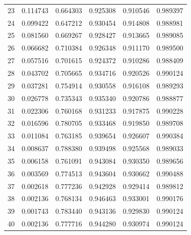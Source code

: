 \begin{table}[ht]
{\begin{tabular}{c c c c c c}
23 & 0.114743 & 0.664303 & 0.925308 & 0.910546 & 0.989397 \\
24 & 0.099422 & 0.647212 & 0.930454 & 0.914808 & 0.988981 \\
25 & 0.081560 & 0.669267 & 0.928427 & 0.913665 & 0.989085 \\
26 & 0.066682 & 0.710384 & 0.926348 & 0.911170 & 0.989500 \\
27 & 0.057516 & 0.701615 & 0.924372 & 0.910286 & 0.988409 \\
28 & 0.043702 & 0.705665 & 0.934716 & 0.920526 & 0.990124 \\
29 & 0.037281 & 0.754914 & 0.930558 & 0.916108 & 0.989293 \\
30 & 0.026778 & 0.735343 & 0.935340 & 0.920786 & 0.988877 \\
31 & 0.022306 & 0.760168 & 0.931233 & 0.917875 & 0.990228 \\
32 & 0.016596 & 0.780705 & 0.933468 & 0.919850 & 0.989708 \\
33 & 0.011084 & 0.763185 & 0.939654 & 0.926607 & 0.990384 \\
34 & 0.008637 & 0.788380 & 0.939498 & 0.925568 & 0.989033 \\
35 & 0.006158 & 0.761091 & 0.943084 & 0.930350 & 0.989656 \\
36 & 0.003569 & 0.774513 & 0.943604 & 0.930662 & 0.990488 \\
37 & 0.002618 & 0.777236 & 0.942928 & 0.929414 & 0.989812 \\
38 & 0.002136 & 0.768134 & 0.946463 & 0.933001 & 0.990176 \\
39 & 0.001743 & 0.783440 & 0.943136 & 0.929830 & 0.990124 \\
40 & 0.002136 & 0.777716 & 0.944280 & 0.930974 & 0.990124 \\
\hline
\end{tabular}
}
\end{table}




